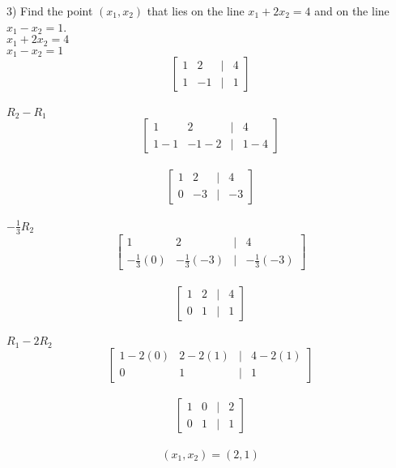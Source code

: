 \documentclass[]{article}
\begin{document}
3) Find the point $(x_1, x_2)$ that lies on the line $x_1+2x_2=4$ and on the line $x_1-x_2=1$.\\
$x_1 + 2x_2 = 4$\\
$x_1-x_2=1$\\
\[
\begin{bmatrix}
	1 & 2 & | & 4 \\
	1 & -1 & | & 1
\end{bmatrix}
\]\\
$R_2 - R_1$\\
\[
\begin{bmatrix}
	1 & 2 & | & 4 \\
	1-1 & -1-2 & | & 1 - 4
\end{bmatrix}
\]\\
\[
\begin{bmatrix}
	1 & 2 & | & 4\\
	0 & -3 & | & -3
\end{bmatrix}
\]\\
$-\frac{1}{3}R_2$\\
\[
\begin{bmatrix}
	1 & 2 & | & 4\\
	-\frac{1}{3}(0) & -\frac{1}{3}(-3) & | & -\frac{1}{3}(-3)
\end{bmatrix}
\]\\
\[
\begin{bmatrix}
	1 & 2 & | & 4 \\
	0 & 1 & | & 1
\end{bmatrix}
\]\\
$R_1 - 2R_2$\\
\[
\begin{bmatrix}
	1 - 2(0) & 2 - 2(1) & | & 4 - 2(1)\\
	0 & 1 & | & 1
\end{bmatrix}
\]\\
\[
\begin{bmatrix}
	1 & 0 & | & 2\\
	0 & 1 & | & 1
\end{bmatrix}
\]\\
$$(x_1, x_2) = (2, 1)$$\\
\end{document}

